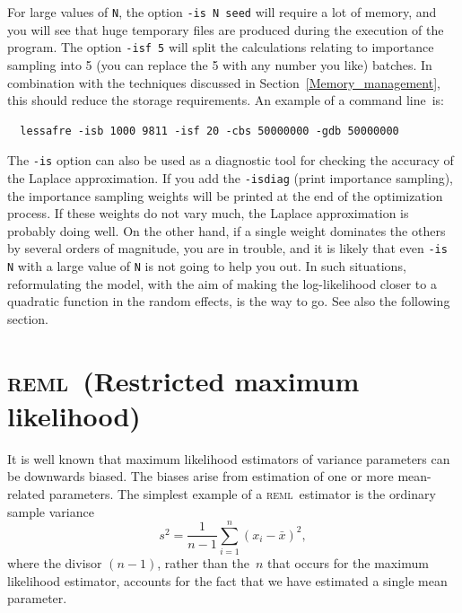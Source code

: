 \documentclass{admbmanual}
\newcommand{\scREML}{\textsc{reml}}
\begin{document}
For large values of \texttt{N}, the option \texttt{-is N seed} will require a lot of memory,
and you will see that huge temporary files are produced during the execution of the program.
The option \texttt{-isf 5} will split the calculations relating to importance sampling
into 5 (you can replace the 5 with any number you like) batches. In combination
with the techniques discussed in Section~\ref{Memory_management}, this should reduce the 
storage requirements. An example of a command line~is:
\begin{lstlisting}
  lessafre -isb 1000 9811 -isf 20 -cbs 50000000 -gdb 50000000
\end{lstlisting}

The \texttt{-is} option can also be used as a diagnostic tool for checking the accuracy of 
the Laplace approximation. If you add the \texttt{-isdiag} (print importance sampling), the 
importance sampling weights will be printed at the end of the optimization process. 
If these weights do not vary much, the Laplace approximation is probably doing well. 
On the other hand, if a single weight dominates the others by several orders of magnitude, 
you are in trouble, and it is likely that even \texttt{-is N} with a large value of \texttt{N} 
is not going to help you out. In such situations, reformulating the model, with the aim of making 
the log-likelihood closer to a quadratic function in the random effects, is the way to go. 
See also the following section.


\section{\scREML\ (Restricted maximum likelihood)}
\label{sec:reml}

It is well known that maximum likelihood estimators of variance parameters can be downwards biased. The biases arise from
estimation of one or more mean-related parameters. The simplest example of a \scREML\ estimator is the ordinary sample
variance
$$
s^2 = \frac{1}{n-1}\sum_{i=1}^{n}(x_i-\bar x)^2,
$$
where the divisor $(n-1)$, rather than the~$n$ that occurs for the maximum likelihood estimator, accounts for the fact that we 
have estimated a single mean parameter.
\end{document}
